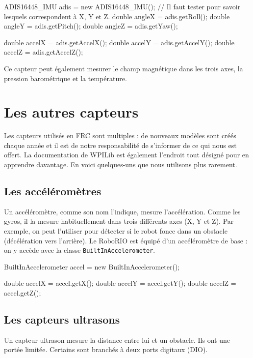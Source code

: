 \documentclass[12pt]{report}
\begin{document}
\begin{code}
ADIS16448_IMU adis = new ADIS16448_IMU();
// Il faut tester pour savoir lesquels correspondent à X, Y et Z.
double angleX = adis.getRoll();
double angleY = adis.getPitch();
double angleZ = adis.getYaw();

double accelX = adis.getAccelX();
double accelY = adis.getAccelY();
double accelZ = adis.getAccelZ();
\end{code}

Ce capteur peut également mesurer le champ magnétique dans les trois axes, la pression barométrique et la température.

\section{Les autres capteurs}

Les capteurs utilisés en FRC sont multiples : de nouveaux modèles sont créés chaque année et il est de notre responsabilité de s'informer de ce qui nous est offert. La documentation de WPILib est également l'endroit tout désigné pour en apprendre davantage. En voici quelques-uns que nous utilisons plus rarement.

\subsection{Les accéléromètres}

Un accéléromètre, comme son nom l'indique, mesure l'accélération. Comme les gyros, il la mesure habituellement dans trois différents axes (X, Y et Z). Par exemple, on peut l'utiliser pour détecter si le robot fonce dans un obstacle (décélération vers l'arrière). Le RoboRIO est équipé d'un accéléromètre de base : on y accède avec la classe \texttt{BuiltInAccelerometer}.

\begin{code}
BuiltInAccelerometer accel = new BuiltInAccelerometer();

double accelX = accel.getX();
double accelY = accel.getY();
double accelZ = accel.getZ();
\end{code}


\subsection{Les capteurs ultrasons}

Un capteur ultrason mesure la distance entre lui et un obstacle. Ils ont une portée limitée. Certains sont branchés à deux ports digitaux (DIO).
\end{document}
